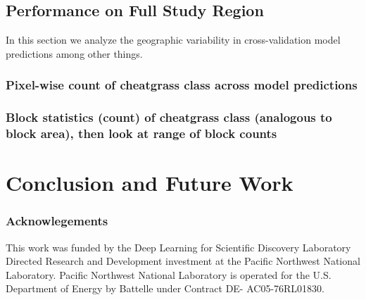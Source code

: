 \documentclass{article} %
\begin{document}
\subsection{Performance on Full Study Region}
In this section we analyze the geographic variability in cross-validation model predictions among other things.
\subsubsection{Pixel-wise count of cheatgrass class across model predictions}
\subsubsection{Block statistics (count) of cheatgrass class (analogous to block area), then look at range of block counts}
\section{Conclusion and Future Work}

\subsubsection*{Acknowlegements}
This work was funded by the Deep Learning for Scientific Discovery Laboratory Directed Research and Development investment at the Pacific Northwest National Laboratory. 
Pacific Northwest National Laboratory is operated for the U.S. Department of Energy by Battelle under Contract DE- AC05-76RL01830.
\nocite{*}


\end{document}
